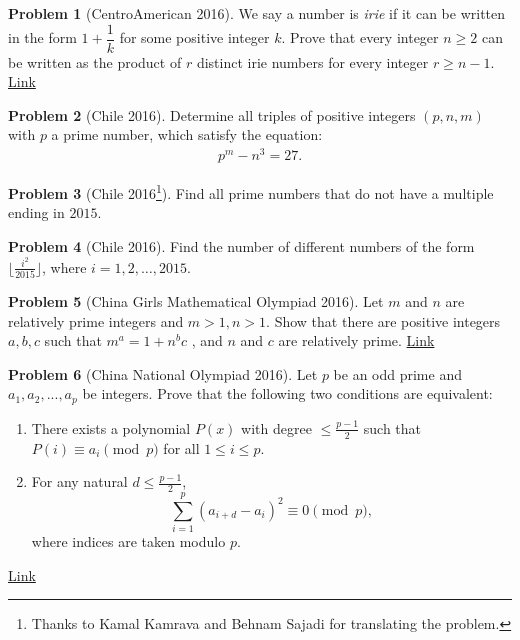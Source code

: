 \documentclass[]{article}
\theoremstyle{definition}
\newtheorem{problem}{Problem}
\begin{document}
\begin{problem}[CentroAmerican 2016]
	We say a number is \textit{irie} if it can be written in the form $1+\dfrac{1}{k}$ for some positive integer $k$. Prove that every integer $n \geq 2$ can be written as the product of $r$ distinct irie numbers for every integer $r \geq n-1$. \hfill \href{http://artofproblemsolving.com/community/c6h1260754p6542783}{Link}
\end{problem}


\begin{problem}[Chile 2016]
	Determine all triples of positive integers $(p, n, m)$ with $p$ a prime number, which satisfy the equation:
		\begin{align*}
			p^m - n^3 = 27.
		\end{align*}
\end{problem}


\begin{problem}[Chile 2016\footnote{Thanks to Kamal Kamrava and Behnam Sajadi for translating the problem.}]
	Find all prime numbers that do not have a multiple ending in $2015$.
\end{problem}

\begin{problem}[Chile 2016]
	Find the number of different numbers of the form $\lfloor\frac{i^2}{2015}\rfloor$, where $i=1,2,\dots,2015$.
\end{problem}


\begin{problem}[China Girls Mathematical Olympiad 2016]
	Let $m$ and $n$ are relatively prime integers and $m>1,n>1$. Show that there are positive integers $a,b,c$ such that $m^a=1+n^bc$ , and $n$ and $c$ are relatively prime. \hfill \href{http://artofproblemsolving.com/community/c6h1288391p6805896}{Link}
\end{problem}



\begin{problem}[China National Olympiad 2016]
	Let $p$ be an odd prime and $a_1, a_2,...,a_p$ be integers. Prove that the following two conditions are equivalent:
		\begin{enumerate}
			\item There exists a polynomial $P(x)$ with degree $\leq \frac{p-1}{2}$ such that $P(i) \equiv a_i \pmod p$ for all $1 \leq i \leq p$.
			\item For any natural $d \leq \frac{p-1}{2}$,
			$$ \sum_{i=1}^p (a_{i+d} - a_i )^2 \equiv 0 \pmod p,$$
			where indices are taken modulo $p$.
		\end{enumerate}
	\flushright \href{http://artofproblemsolving.com/community/c6h1174698p5660061}{Link}
\end{problem}
\end{document}
